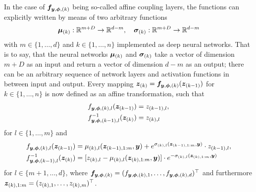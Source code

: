 \documentclass[a4paper,11pt]{report}
\def\fc#1{{\color{black}{#1}}} %
\begin{document}
In the case of $\bm{f}_{\bm{y},\bm{\phi},(k)}$ being so-called affine coupling layers, the functions can explicitly \fc{be} written by means of two arbitrary functions \begin{equation}
\bm{\mu}_{(k)}: \mathbb{R}^{m+D} \rightarrow \mathbb{R}^{d-m}, \quad \bm{\sigma}_{(k)}: \mathbb{R}^{m+D} \rightarrow \mathbb{R}^{d-m}
\end{equation} with $m \in \{1,\dots,d\}$ and $k \in \{1,\dots,n\}$ implemented as deep neural networks. That is to say, that the neural networks $\bm{\mu}_{(k)}$ and $\bm{\sigma}_{(k)}$ take a vector of dimension $m+D$ as an input and return a vector of dimension $d-m$ as an output; there can be an arbitrary sequence of network layers and activation functions in between input and output. Every mapping $\bm{z}_{(k)} = \bm{f}_{\bm{y},\bm{\phi},(k)}(\bm{z}_{(k-1)})$ for $k \in \{1,\dots,n\}$ is now defined as an affine transformation, such that \begin{align}
f_{\bm{y},\bm{\phi},(k),l}(\bm{z}_{(k-1)}) &= z_{(k-1),l}, \\
f_{\bm{y},\bm{\phi},(k-1),l}^{-1}(\bm{z}_{(k)}) &= 
z_{(k),l}
\end{align} for $l \in \{1,\dots,m\}$
and
\begin{align}
f_{\bm{y},\bm{\phi},(k),l}(\bm{z}_{(k-1)}) &= 
\mu_{(k),l}(\bm{z}_{(k-1),1:m},\bm{y}) + e^{\sigma_{(k),l}(\bm{z}_{(k-1),1:m},\bm{y})}\cdot z_{(k-1),l}, \\
f_{\bm{y},\bm{\phi},(k-1),l}^{-1}(\bm{z}_{(k)}) &= [z_{(k),l} - \mu_{(k),l}(\bm{z}_{(k),1:m},\bm{y})]\cdot  e^{-\sigma_{(k),l}(\bm{z}_{(k),1:m},\bm{y})}
\end{align} for $l \in \{m+1,\dots,d\}$, where $\bm{f}_{\bm{y},\bm{\phi},(k)} = (f_{\bm{y},\bm{\phi},(k),1},\dots,f_{\bm{y},\bm{\phi},(k),d})^\top$ and furthermore $\bm{z}_{(k),1:m} = (z_{(k),1},\dots, z_{(k),m})^\top$.
\end{document}
